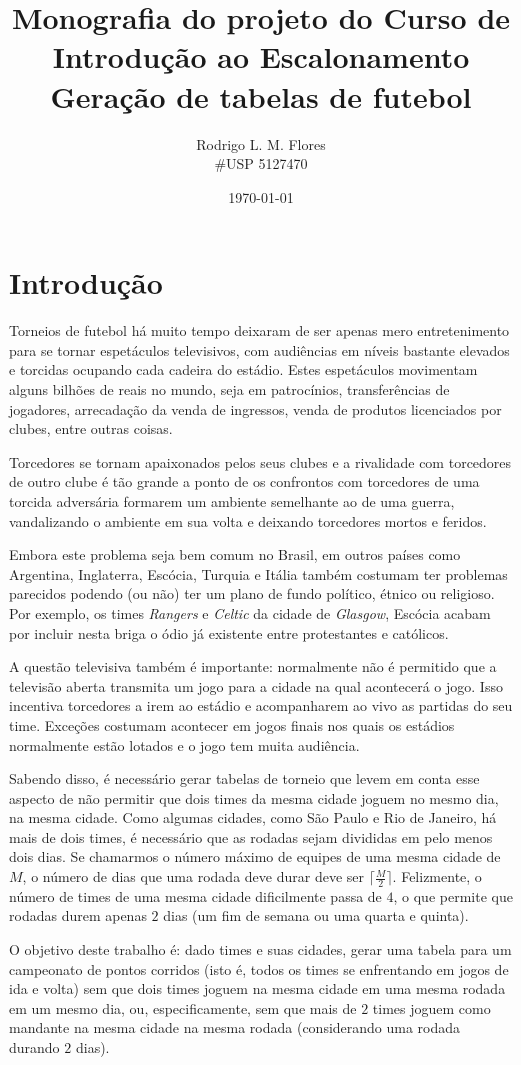 \documentclass[a4paper,12pt,titlepage]{article}
\title{Monografia do projeto do Curso de Introdução ao Escalonamento \\ Geração de tabelas de futebol}
\author{Rodrigo L. M. Flores \\ \#USP 5127470}
\date{\today}
\begin{document}
\maketitle

\section{Introdução}

Torneios de futebol há muito tempo deixaram de ser apenas mero entretenimento para se tornar espetáculos televisivos,
com audiências em níveis bastante elevados e torcidas ocupando cada cadeira do estádio. Estes espetáculos movimentam
alguns bilhões de reais no mundo, seja em patrocínios, transferências de jogadores, arrecadação da venda de ingressos,
venda de produtos licenciados por clubes, entre outras coisas. 

Torcedores se tornam apaixonados pelos seus clubes e a rivalidade com torcedores de outro clube é tão grande a 
ponto de os confrontos com torcedores de uma torcida 
adversária formarem um ambiente semelhante ao de uma guerra, vandalizando o ambiente em sua volta e deixando  
torcedores mortos e feridos.

Embora este problema seja bem comum no Brasil, em outros países como Argentina, Inglaterra, Escócia, Turquia e Itália também costumam
ter problemas parecidos podendo (ou não) ter um plano de fundo político, étnico ou religioso. Por exemplo, os times \textit{Rangers} 
e \textit{Celtic} da cidade de \textit{Glasgow}, Escócia acabam por incluir nesta briga o ódio já existente 
entre protestantes e católicos. 

A questão televisiva também é importante: normalmente não é permitido que a televisão aberta transmita um jogo para a cidade 
na qual acontecerá o jogo. Isso incentiva torcedores a irem ao estádio e acompanharem ao vivo as partidas do seu time. Exceções
costumam acontecer em jogos finais nos quais os estádios normalmente estão lotados e o jogo tem muita audiência. 

Sabendo disso, é necessário gerar tabelas de torneio que levem em conta esse aspecto de não permitir que dois times da mesma cidade joguem 
no mesmo dia, na mesma cidade. Como algumas cidades, como São Paulo e Rio de Janeiro, há mais de dois times, 
é necessário que as rodadas sejam divididas em pelo menos dois dias.  Se chamarmos o número máximo de equipes de uma mesma cidade
de $M$, o número de dias que uma rodada deve durar deve ser $\lceil\frac{M}{2}\rceil$. Felizmente, o número de times de uma
mesma cidade dificilmente passa de $4$, o que permite que rodadas durem apenas $2$ dias (um fim de semana ou uma quarta e quinta).

O objetivo deste trabalho é: dado times e suas cidades, gerar uma tabela para um campeonato de pontos corridos (isto é, todos os times
se enfrentando em jogos de ida e volta) sem que dois times joguem na mesma cidade em uma mesma rodada em um mesmo dia, 
ou, especificamente, sem que mais de $2$ times joguem como mandante na mesma cidade na 
mesma rodada (considerando uma rodada durando $2$ dias). 






\end{document}
